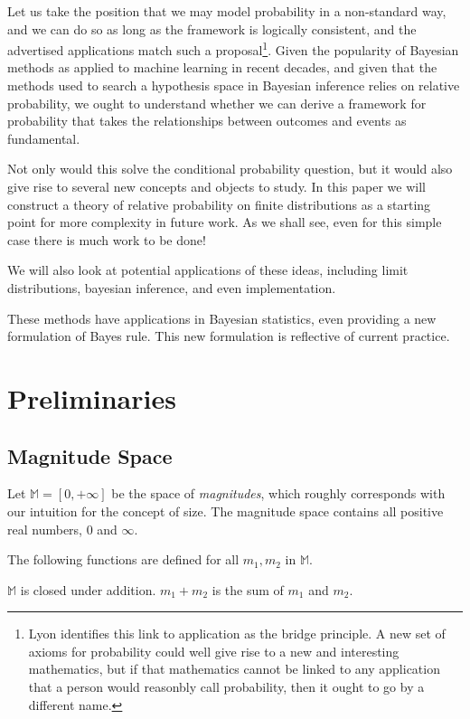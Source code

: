 \documentclass[twoside]{article}
\begin{document}
Let us take the position that we may model probability in a non-standard way, and we can do so as long as the framework is logically consistent, and the advertised applications match such a proposal\footnote{Lyon identifies this link to application as the bridge principle. A new set of axioms for probability could well give rise to a new and interesting mathematics, but if that mathematics cannot be linked to any application that a person would reasonbly call probability, then it ought to go by a different name.}. Given the popularity of Bayesian methods as applied to machine learning in recent decades, and given that the methods used to search a hypothesis space in Bayesian inference relies on relative probability\cite{sklar_bias}, we ought to understand whether we can derive a framework for probability that takes the relationships between outcomes and events as fundamental.

Not only would this solve the conditional probability question, but it would also give rise to several new concepts and objects to study. In this paper we will construct a theory of relative probability on finite distributions as a starting point for more complexity in future work. As we shall see, even for this simple case there is much work to be done!

We will also look at potential applications of these ideas, including limit distributions, bayesian inference, and even implementation.

These methods have applications in Bayesian statistics, even providing a new formulation of Bayes rule. This new formulation is reflective of current practice.

\section{Preliminaries}
\subsection{Magnitude Space}

Let \(\mathbb{M} = [0, +\infty]\) be the space of \textit{magnitudes}, which roughly corresponds with our intuition for the concept of size. The magnitude space contains all positive real numbers, \(0\) and \(\infty\).

The following functions are defined for all \(m_1, m_2\) in \(\mathbb{M}\).

\(\mathbb{M}\) is closed under addition. \(m_1 + m_2\) is the sum of \(m_1\) and \(m_2\).
\end{document}

